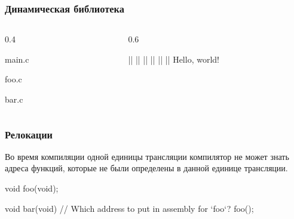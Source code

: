 \documentclass[compress, 8pt, aspectratio=169]{beamer}
\begin{document}
\begin{frame}[fragile]

    \frametitle{Динамическая библиотека}

    \begin{columns}[T]

        \begin{column}{0.4\textwidth}

                {main.c}

                {foo.c}

                {bar.c}

        \end{column}

        \begin{column}{0.6\textwidth}

            \begin{terminalwindow}[||]
||
||
||
||
||
||
Hello, world!
            \end{terminalwindow}

        \end{column}

    \end{columns}

\end{frame}


\begin{frame}[fragile]

    \frametitle{Релокации}

    Во время компиляции одной единицы трансляции компилятор
    не может знать адреса функций, которые не были определены
    в данной единице трансляции.

    \bigbreak

    \begin{myinplacelisting}[minted language=c]
void foo(void);

void bar(void) {
    // Which address to put in assembly for `foo`?
    foo();
}
    \end{myinplacelisting}

\end{frame}
\end{document}
